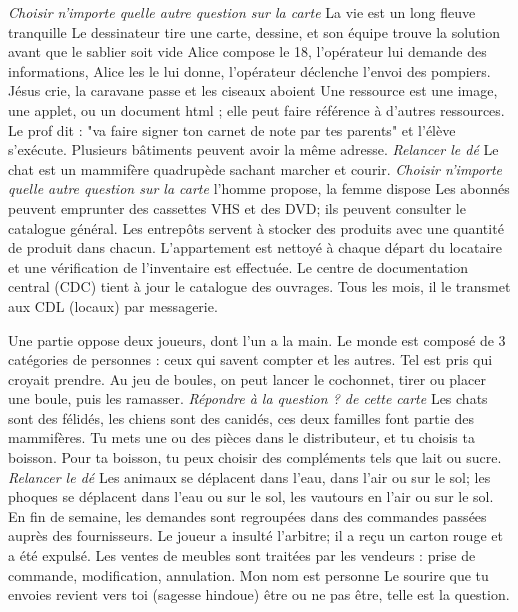 \newrow
\umlpiccard
{\emph{Choisir n'importe quelle autre question sur la carte}
}
{La vie est un long fleuve tranquille
}
{Le dessinateur tire une carte, dessine, et son équipe trouve la solution avant que le sablier soit vide
}
{Alice compose le 18, l'opérateur lui demande des informations, Alice les le lui donne, l'opérateur déclenche l'envoi des pompiers.
}
\umlpiccard
{\challenge Jésus crie, la caravane passe et les ciseaux aboient
}
{Une ressource est une image, une applet, ou un document html ; elle peut faire référence à d'autres ressources.
}
{Le prof dit : "va faire signer ton carnet de note par tes parents" et l'élève s'exécute.
}
{Plusieurs bâtiments peuvent avoir la même adresse.
}
\umlpiccard
{\emph{Relancer le dé}
}
{\challenge Le chat est un mammifère quadrupède sachant marcher et courir.
}
{\emph{Choisir n'importe quelle autre question sur la carte}
}
{\challenge l'homme propose, la femme dispose
}
\umlpiccard
{Les abonnés peuvent emprunter des cassettes VHS et des DVD; ils peuvent consulter le catalogue général.
}
{Les entrepôts servent à stocker des produits avec une quantité de produit dans chacun.
}
{L'appartement est nettoyé à chaque départ du locataire et une vérification de l'inventaire est effectuée.
}
{Le centre de documentation central (CDC) tient à jour le catalogue des ouvrages. Tous les mois, il le transmet aux CDL (locaux) par messagerie.
}

\newrow
\umlpiccard
{\challenge Une partie oppose deux joueurs, dont l'un a la main.
}
{\challenge Le monde est composé de 3 catégories de personnes : ceux qui savent compter et les autres.
}
{\challenge Tel est pris qui croyait prendre.
}
{Au jeu de boules, on peut lancer le cochonnet, tirer ou placer une boule, puis les ramasser.
}
\umlpiccard
{\emph{Répondre à la question ? de cette carte} 
}
{Les chats sont des félidés, les chiens sont des canidés, ces deux familles font partie des mammifères.
}
{Tu mets une ou des pièces dans le distributeur, et tu choisis ta boisson.
}
{\challenge Pour ta boisson, tu peux choisir des compléments tels que lait ou sucre.
}
\umlpiccard
{\emph{Relancer le dé}
}
{\challenge Les animaux se déplacent dans l'eau, dans l'air ou sur le sol; les phoques se déplacent dans l'eau ou sur le sol, les vautours en l'air ou sur le sol.
}
{En fin de semaine, les demandes sont regroupées dans des commandes passées auprès des fournisseurs.
}
{Le joueur a insulté l'arbitre; il a reçu un carton rouge et a été expulsé.
}
\umlpiccard
{Les ventes de meubles sont traitées par les vendeurs : prise de commande, modification, annulation.
}
{\challenge Mon nom est personne
}
{Le sourire que tu envoies revient vers toi (sagesse hindoue)
}
{\challenge être ou ne pas être, telle est la question.
}

